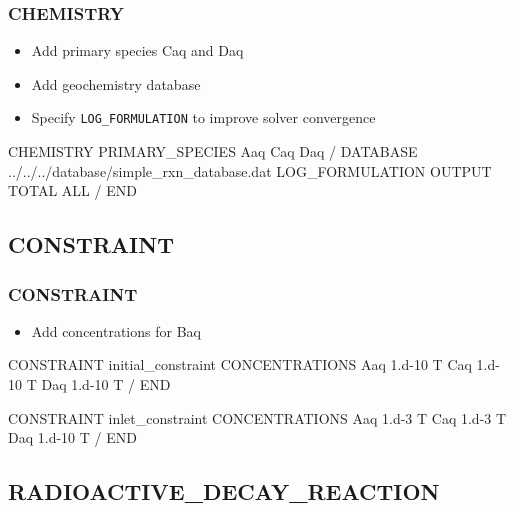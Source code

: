 \documentclass{beamer}
\newcommand\magentacomment[1]{{{\color{magenta} #1}}}
\begin{document}
\begin{frame}\frametitle{CHEMISTRY}

\begin{itemize}
  \item Add primary species Caq and Daq
  \item Add geochemistry database
  \item Specify \verb|LOG_FORMULATION| to improve solver convergence
\end{itemize}

\begin{semiverbatim}
CHEMISTRY
  PRIMARY_SPECIES
    Aaq
    \magentacomment{Caq}
    \magentacomment{Daq}
  /
  \magentacomment{DATABASE ../../../database/simple_rxn_database.dat}
  \magentacomment{LOG_FORMULATION}
  OUTPUT
    TOTAL
    ALL
  /
END
\end{semiverbatim}

\end{frame}

\subsection{CONSTRAINT}

\begin{frame}[fragile]\frametitle{CONSTRAINT}

\begin{itemize}
  \item Add concentrations for Baq
\end{itemize}

\begin{semiverbatim}

CONSTRAINT initial_constraint
  CONCENTRATIONS
    Aaq   1.d-10   T
    \magentacomment{Caq   1.d-10   T}
    \magentacomment{Daq   1.d-10   T}
  /
END

CONSTRAINT inlet_constraint
  CONCENTRATIONS
    Aaq   1.d-3    T
    \magentacomment{Caq   1.d-3    T}
    \magentacomment{Daq   1.d-10   T}
  /
END

\end{semiverbatim}

\end{frame}

\subsection{RADIOACTIVE\_DECAY\_REACTION}
\end{document}
